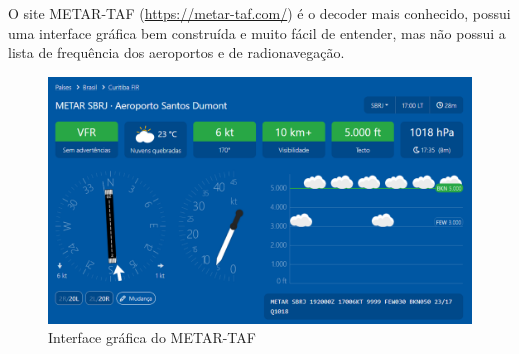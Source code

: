 O site METAR-TAF (\url{https://metar-taf.com/}) é o decoder mais conhecido, possui uma interface 
gráfica bem construída
e muito fácil de entender, mas não possui a lista de frequência dos aeroportos e
de radionavegação.

\begin{figure}[ht]
    \begin{center}
    \includegraphics[width=400pt]{img/ui-metar-taf.png}
    \caption{Interface gráfica do METAR-TAF}
    \label{fig:metar-taf}
    \end{center}
\end{figure}
